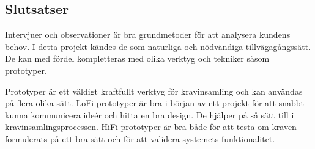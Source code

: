 \subsection{Slutsatser}
Intervjuer och observationer är bra grundmetoder för att analysera kundens behov. I detta projekt kändes de som naturliga och nödvändiga tillvägagångssätt. De kan med fördel kompletteras med olika verktyg och tekniker såsom prototyper. 

Prototyper är ett väldigt kraftfullt verktyg för kravinsamling och kan användas på flera olika sätt. LoFi-prototyper är bra i början av ett projekt för att snabbt kunna kommunicera ideér och hitta en bra design. De hjälper på så sätt till i kravinsamlingsprocessen. HiFi-prototyper är bra både för att testa om kraven formulerats på ett bra sätt och för att validera systemets funktionalitet.







